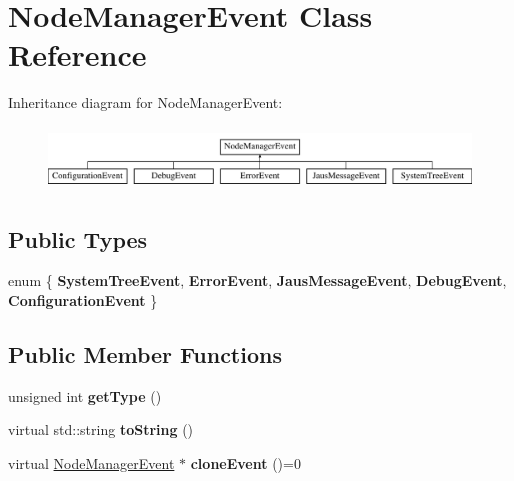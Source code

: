 \hypertarget{class_node_manager_event}{\section{\-Node\-Manager\-Event \-Class \-Reference}
\label{class_node_manager_event}
}
\-Inheritance diagram for \-Node\-Manager\-Event\-:\begin{figure}[H]
\begin{center}
\leavevmode
\includegraphics[height=1.684211cm]{class_node_manager_event}
\end{center}
\end{figure}
\subsection*{\-Public \-Types}
\begin{DoxyCompactItemize}
\item 
enum \{ \*
{\bfseries \-System\-Tree\-Event}, 
{\bfseries \-Error\-Event}, 
{\bfseries \-Jaus\-Message\-Event}, 
{\bfseries \-Debug\-Event}, 
\*
{\bfseries \-Configuration\-Event}
 \}
\end{DoxyCompactItemize}
\subsection*{\-Public \-Member \-Functions}
\begin{DoxyCompactItemize}
\item 
\hypertarget{class_node_manager_event_a93223a15adba6a26f72df8aefef10c43}{unsigned int {\bfseries get\-Type} ()}\label{class_node_manager_event_a93223a15adba6a26f72df8aefef10c43}

\item 
\hypertarget{class_node_manager_event_a0cc0c1b829e1f8280d12058ecbd98193}{virtual std\-::string {\bfseries to\-String} ()}\label{class_node_manager_event_a0cc0c1b829e1f8280d12058ecbd98193}

\item 
\hypertarget{class_node_manager_event_abc26f5f0b4b76f59b301e0377c0bc392}{virtual \hyperlink{class_node_manager_event}{\-Node\-Manager\-Event} $\ast$ {\bfseries clone\-Event} ()=0}\label{class_node_manager_event_abc26f5f0b4b76f59b301e0377c0bc392}

\end{DoxyCompactItemize}

